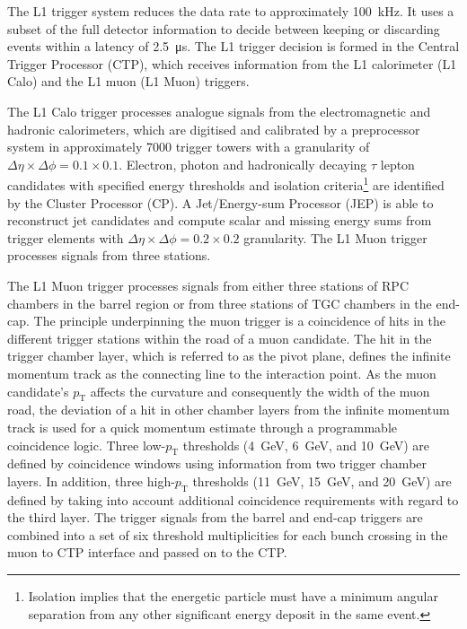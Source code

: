 The L1 trigger system reduces the data rate to approximately \SI{100}{\kilo\hertz}. It uses a subset of the full detector information to decide between keeping or discarding events within a latency of \SI{2.5}{\micro\second}. The L1 trigger decision is formed in the Central Trigger Processor (CTP), which receives information from the L1 calorimeter (L1 Calo) and the L1 muon (L1 Muon) triggers.

The L1 Calo trigger processes analogue signals from the electromagnetic and hadronic calorimeters, which are digitised and calibrated by a preprocessor system in approximately 7000 trigger towers with a granularity of \(\Delta \eta \times \Delta \phi = 0.1 \times 0.1\).
Electron, photon and hadronically decaying \(\tau\) lepton candidates with specified energy thresholds and isolation criteria\footnote{Isolation implies that the energetic particle must have a minimum angular separation from any other significant energy deposit in the same event.} are identified by the Cluster Processor (CP). A Jet/Energy-sum Processor (JEP) is able to reconstruct jet candidates and compute scalar and missing energy sums from trigger elements with \(\Delta \eta \times \Delta \phi = 0.2 \times 0.2\) granularity.
The L1 Muon trigger processes signals from three stations.

The L1 Muon trigger processes signals from either three stations of RPC chambers in the barrel region or from three stations of TGC chambers in the end-cap. The principle underpinning the muon trigger is a coincidence of hits in the different trigger stations within the road of a muon candidate. The hit in the trigger chamber layer, which is referred to as the pivot plane, defines the infinite momentum track as the connecting line to the interaction point. As the muon candidate's \(p_{\text{T}}\) affects the curvature and consequently the width of the muon road, the deviation of a hit in other chamber layers from the infinite momentum track is used for a quick momentum estimate through a programmable coincidence logic. Three low-\(p_{\text{T}}\) thresholds (\SI{4}{\giga\electronvolt}, \SI{6}{\giga\electronvolt}, and \SI{10}{\giga\electronvolt}) are defined by coincidence windows using information from two trigger chamber layers. In addition, three high-\(p_{\text{T}}\) thresholds (\SI{11}{\giga\electronvolt}, \SI{15}{\giga\electronvolt}, and \SI{20}{\giga\electronvolt}) are defined by taking into account additional coincidence requirements with regard to the third layer.
The trigger signals from the barrel and end-cap triggers are combined into a set of six threshold multiplicities for each bunch crossing in the muon to CTP interface and passed on to the CTP.

